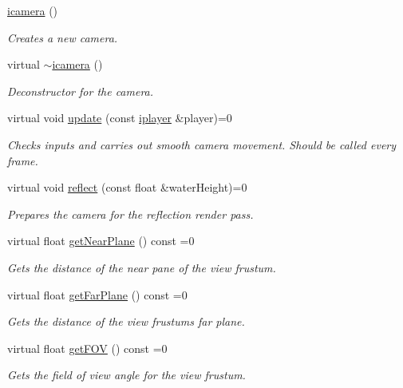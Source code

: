 \begin{DoxyCompactItemize}
\item 
\hyperlink{classflounder_1_1icamera_aec1dc813f1b6a4b4ea2c56d61fa28525}{icamera} ()
\begin{DoxyCompactList}\small\item\em Creates a new camera. \end{DoxyCompactList}\item 
virtual \hyperlink{classflounder_1_1icamera_a5aa4bb60028823af733a8de1532b7f6f}{$\sim$icamera} ()
\begin{DoxyCompactList}\small\item\em Deconstructor for the camera. \end{DoxyCompactList}\item 
virtual void \hyperlink{classflounder_1_1icamera_ac488c3db589fbba024d80d1f41dd7983}{update} (const \hyperlink{classflounder_1_1iplayer}{iplayer} \&player)=0
\begin{DoxyCompactList}\small\item\em Checks inputs and carries out smooth camera movement. Should be called every frame. \end{DoxyCompactList}\item 
virtual void \hyperlink{classflounder_1_1icamera_a20ee0d37d318012ac51e132ed02af6da}{reflect} (const float \&water\+Height)=0
\begin{DoxyCompactList}\small\item\em Prepares the camera for the reflection render pass. \end{DoxyCompactList}\item 
virtual float \hyperlink{classflounder_1_1icamera_a1b7c9e3be4be8c5aab2a3c1b41430c47}{get\+Near\+Plane} () const =0
\begin{DoxyCompactList}\small\item\em Gets the distance of the near pane of the view frustum. \end{DoxyCompactList}\item 
virtual float \hyperlink{classflounder_1_1icamera_a38f71d53573a018836d899973996a3c0}{get\+Far\+Plane} () const =0
\begin{DoxyCompactList}\small\item\em Gets the distance of the view frustum\textquotesingle{}s far plane. \end{DoxyCompactList}\item 
virtual float \hyperlink{classflounder_1_1icamera_a1bf12448ac5ea3ed1ffa7c9a73424dde}{get\+F\+OV} () const =0
\begin{DoxyCompactList}\small\item\em Gets the field of view angle for the view frustum. \end{DoxyCompactList}\item 

\end{DoxyCompactItemize}
